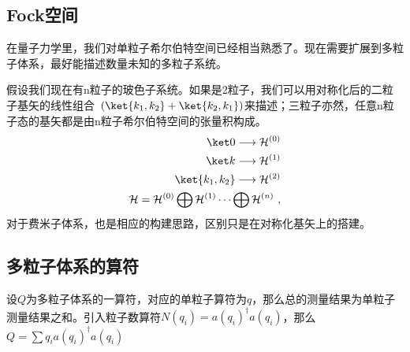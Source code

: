 \subsection{Fock空间}
在量子力学里，我们对单粒子希尔伯特空间已经相当熟悉了。现在需要扩展到多粒子体系，最好能描述数量未知的多粒子系统。

假设我们现在有n粒子的玻色子系统。如果是2粒子，我们可以用对称化后的二粒子基矢的线性组合~$(\ket {k_1,k_2}+\ket {k_2,k_1})$来描述；三粒子亦然，任意n粒子态的基矢都是由n粒子希尔伯特空间的张量积构成。
\begin{align}
\ket 0 \longrightarrow \mathcal{H}^{(0)} \\
\ket k \longrightarrow \mathcal{H}^{(1)} \\
\ket {k_1,k_2}\longrightarrow \mathcal{H}^{(2)}\\
\mathcal{H}=\mathcal{H}^{(0)} \bigoplus \mathcal{H}^{(1)} \cdots \bigoplus \mathcal{H}^{(n)}~,
\end{align}
对于费米子体系，也是相应的构建思路，区别只是在对称化基矢上的搭建。
\subsection{多粒子体系的算符}
设$Q$为多粒子体系的一算符，对应的单粒子算符为$q$，那么总的测量结果为单粒子测量结果之和。引入粒子数算符$N(q_i)=a(q_i)^\dagger a(q_i)$，那么$Q=\sum q_i a(q_i)^\dagger a(q_i) $


